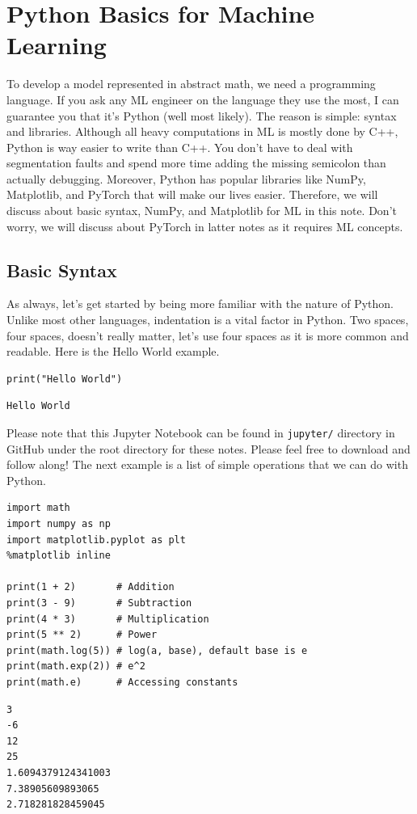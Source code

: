 \documentclass[../../../main.tex]{subfiles}
\begin{document}
\chapter{Python Basics for Machine Learning}

To develop a model represented in abstract math, we need a
programming language. If you ask any ML engineer on the
language they use the most, I can guarantee you that it's
Python (well most likely). The reason is simple: syntax and
libraries. Although all heavy computations in ML is mostly done
by C++, Python is way easier to write than C++. You don't have to
deal with segmentation faults and spend more time adding the
missing semicolon than actually debugging. Moreover, Python has
popular libraries like NumPy, Matplotlib, and PyTorch that will
make our lives easier. Therefore, we will discuss about basic
syntax, NumPy, and Matplotlib for ML in this note. Don't worry,
we will discuss about PyTorch in latter notes as it requires
ML concepts.

\section{Basic Syntax}

As always, let's get started by being more familiar with the
nature of Python. Unlike most other languages, indentation is a
vital factor in Python. Two spaces, four spaces, doesn't really
matter, let's use four spaces as it is more common and readable.
Here is the Hello World example.

\begin{jupyter}
\begin{lstlisting}[style=jin]
print("Hello World")
\end{lstlisting}

\begin{lstlisting}[style=jout]
Hello World
\end{lstlisting}
\end{jupyter}

Please note that this Jupyter Notebook can be found in
\verb|jupyter/| directory in GitHub under the root directory for
these notes. Please feel free to download and follow along!
The next example is a list of simple operations that we can
do with Python.

\begin{jupyter}
\begin{lstlisting}[style=jin]
import math
import numpy as np
import matplotlib.pyplot as plt
%matplotlib inline

print(1 + 2)       # Addition
print(3 - 9)       # Subtraction
print(4 * 3)       # Multiplication
print(5 ** 2)      # Power
print(math.log(5)) # log(a, base), default base is e
print(math.exp(2)) # e^2
print(math.e)      # Accessing constants
\end{lstlisting}

\begin{lstlisting}[style=jout]
3
-6
12
25
1.6094379124341003
7.38905609893065
2.718281828459045
\end{lstlisting}
\end{jupyter}
\end{document}
